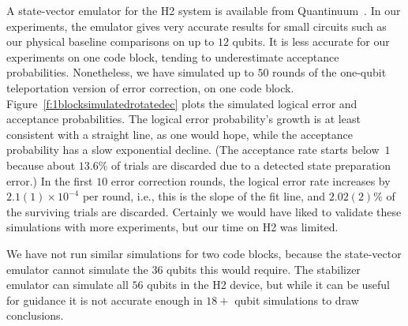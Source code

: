 \documentclass[10pt, twocolumn, aps, nofootinbib, longbibliography, nobibnotes, superscriptaddress]{revtex4-1} %
\begin{document}
\smallskip

A state-vector emulator for the H2 system is available from Quantinuum~\cite{Quantinuum24emulator}.  
In our experiments, the emulator gives very accurate results for small circuits such as our physical baseline comparisons on up to $12$ qubits.  It is less accurate for our experiments on one code block, tending to underestimate acceptance probabilities.  Nonetheless, we have simulated up to $50$ rounds of the one-qubit teleportation version of error correction, on one code block.  Figure~\ref{f:1blocksimulatedrotatedec} plots the simulated logical error and acceptance probabilities.  The logical error probability's growth is at least consistent with a straight line, as one would hope, while the acceptance probability has a slow exponential decline.  (The acceptance rate starts below~$1$ because about $13.6\%$ of trials are discarded due to a detected state preparation error.)  In the first $10$ error correction rounds, the logical error rate increases by $2.1(1) \times 10^{-4}$ per round, i.e., this is the slope of the fit line, and $2.02(2)\%$ of the surviving trials are discarded.  %
Certainly we would have liked to validate these simulations with more experiments, but our time on H2 was limited.  


We have not run similar simulations for two code blocks, because the state-vector emulator cannot simulate the $36$ qubits this would require.  The stabilizer emulator can simulate all $56$ qubits in the H2 device, but while it can be useful for guidance it is not accurate enough in $18+$ qubit simulations to draw conclusions.  
\end{document}
